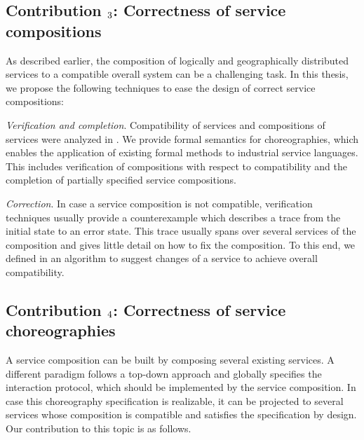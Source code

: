 \subsection*{Contribution $\mathnormal{3}$: Correctness of service compositions}

As described earlier, the composition of logically and geographically distributed services to a compatible overall system can be a challenging task. In this thesis, we propose the following techniques to ease the design of correct service compositions:

\begin{niceitemize}
\item \emph{Verification and completion}. Compatibility of  services and compositions of  services were analyzed in \cite{LohmannKLR_2007_wsfm}. We provide formal semantics for \bpelchor{} choreographies, which enables the application of existing formal methods to industrial service languages. This includes verification of compositions with respect to compatibility and the completion of partially specified service compositions.

\item \emph{Correction}. In case a service composition is not compatible, verification techniques usually provide a counterexample which describes a trace from the initial state to an error state. This trace usually spans over several services of the composition and gives little detail on how to fix the composition. To this end, we defined in \cite{Lohmann_2008_bpm} an algorithm to suggest changes of a service to achieve overall compatibility.
\end{niceitemize}




\subsection*{Contribution $\mathnormal{4}$: Correctness of service choreographies}

A service composition can be built by composing several existing services. A different paradigm follows a top-down approach and globally specifies the interaction protocol, which should be implemented by the service composition. In case this choreography specification is realizable, it can be projected to several services whose composition is compatible and satisfies the specification by design. Our contribution to this topic is as follows.

